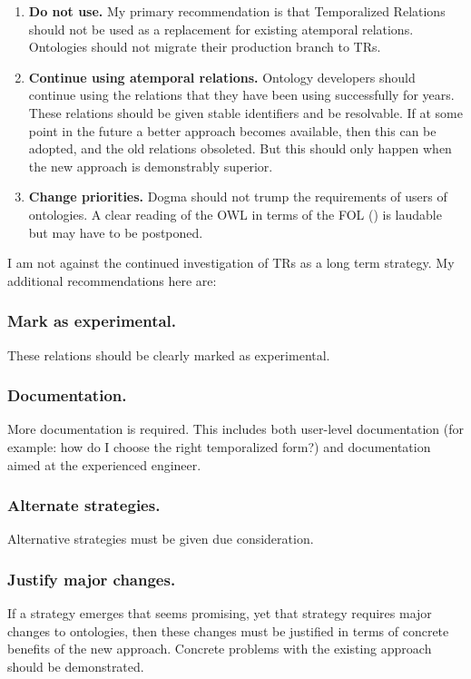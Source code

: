 \documentclass{bioinfo}
\def\P1{\pr{P-1}}
\begin{document}
\begin{enumerate}

\item \textbf{Do not use.} My primary recommendation is that
  Temporalized Relations should not be used as a replacement for
  existing atemporal relations. Ontologies should not migrate their
  production branch to TRs.

\item \textbf{Continue using atemporal relations.} Ontology developers
  should continue using the relations that they have been using
  successfully for years. These relations should be given stable
  identifiers and be resolvable. If at some point in the future a
  better approach becomes available, then this can be adopted, and the
  old relations obsoleted. But this should only happen when the new
  approach is demonstrably superior.

\item \textbf{Change priorities.} Dogma should not trump the
  requirements of users of ontologies. A clear reading of the OWL in
  terms of the FOL (\P1) is laudable but may have to be postponed.

\end{enumerate}

I am not against the continued investigation of TRs as a long term
strategy. My additional recommendations here are:

\subsubsection{Mark as experimental.} These relations should be clearly
marked as experimental.

\subsubsection{Documentation.} More documentation is required. This
includes both user-level documentation (for example: how do I choose
the right temporalized form?) and documentation aimed at the
experienced engineer.

\subsubsection{Alternate strategies.} Alternative strategies must be
given due consideration.

\subsubsection{Justify major changes.} If a strategy emerges that
seems promising, yet that strategy requires major changes to
ontologies, then these changes must be justified in terms of concrete
benefits of the new approach. Concrete problems with the existing
approach should be demonstrated.
\end{document}
